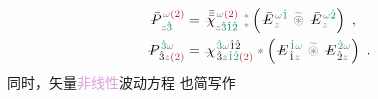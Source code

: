 \begin{subequations} \label{eq:DP^(2)-3_12-spectrum}
	\abovedisplayskip=-10pt
\begin{align}
	\Xint{\mathcolor{gray}{-}}{30}{\bar{P}}^{\;\! \mathcolor{gray}{\omega} \textcolor{Maroon}{(2)} }_{\;\! \mathcolor{gray}{z} \textcolor{PineGreen}{\hat{3}}} &= \Xint{{}^{}_{\mathcolor{gray}{-}}}{23}{\bar{\bar{\bar{\chi}}}}^{\;\! \mathcolor{gray}{\omega} \textcolor{Maroon}{(2)}}_{\mathcolor{gray}{z} \textcolor{PineGreen}{\hat{3} \hat{1} \hat{2}} } ~{}^{\mathcolor{gray}{*}}_{\mathcolor{gray}{*}} \left( \Xint{\mathcolor{gray}{-}}{295}{\bar{E}}^{\;\! \mathcolor{gray}{\omega} \textcolor{PineGreen}{\hat{1}} }_{\;\! \mathcolor{gray}{z} } ~\mathcolor{gray}{\widetilde \circledast}~ \Xint{\mathcolor{gray}{-}}{295}{\bar{E}}^{\;\! \mathcolor{gray}{\omega} \textcolor{PineGreen}{\hat{2}} }_{\;\! \mathcolor{gray}{z} } \right) ~, \label{eq:vec-DP^(2)-3_12-spectrum} \\
	\Xint{\mathcolor{gray}{-}}{30}{P}^{\;\! \textcolor{PineGreen}{\hat{3}} \mathcolor{gray}{\omega} }_{\;\! \hat{3}\mathcolor{gray}{z} \textcolor{Maroon}{(2)} } &= \Xint{{}^{}_{\mathcolor{gray}{-}}}{23}{\chi}^{\;\! \textcolor{PineGreen}{\hat{3}} \mathcolor{gray}{\omega} \hat{1} \hat{2} }_{\;\! \hat{3} \mathcolor{gray}{z} \textcolor{PineGreen}{\hat{1} \hat{2}} \textcolor{Maroon}{(2)}} \mathcolor{gray}{*} \left( \Xint{\mathcolor{gray}{-}}{295}{E}^{\;\! \textcolor{PineGreen}{\hat{1}} \mathcolor{gray}{\omega} }_{\;\! \hat{1} \mathcolor{gray}{z}} ~\mathcolor{gray}{\widetilde \circledast}~ \Xint{\mathcolor{gray}{-}}{295}{E}^{\;\! \textcolor{PineGreen}{\hat{2}} \mathcolor{gray}{\omega} }_{\;\! \hat{2} \mathcolor{gray}{z}} \right) ~. \label{eq:components-DP^(2)-3_12-spectrum}
\end{align}
\end{subequations}
同时，矢量\textcolor{Plum}{非线性}波动方程  也简写作
